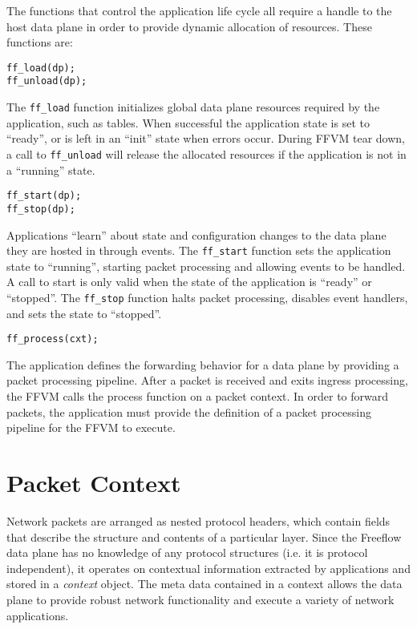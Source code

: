 The functions that control the application life cycle all require a handle
to the host data plane in order to provide dynamic allocation of resources.
These functions are:

\begin{lstlisting}
ff_load(dp);
ff_unload(dp);
\end{lstlisting}

The \texttt{ff\_load} function initializes global data plane resources required
by the application, such as tables. When successful the application state is
set to ``ready'', or is left in an ``init'' state when errors occur. During
FFVM tear down, a call to \texttt{ff\_unload} will release the allocated
resources if the application is not in a ``running'' state.

\begin{lstlisting}
ff_start(dp);
ff_stop(dp);
\end{lstlisting}

Applications ``learn'' about state and configuration changes to the data plane
they are hosted in through events. The \texttt{ff\_start} function sets the
application state to ``running'', starting packet processing and allowing events
to be handled. A call to start is only valid when the state of the application
is ``ready'' or ``stopped''. The \texttt{ff\_stop} function halts packet
processing, disables event handlers, and sets the state to ``stopped''.

\begin{lstlisting}
ff_process(cxt);
\end{lstlisting}

The application defines the forwarding behavior for a data plane by providing
a packet processing pipeline. After a packet is received and exits ingress
processing, the FFVM calls the process function on a packet context. In order
to forward packets, the application must provide the definition of a packet
processing pipeline for the FFVM to execute.

\section{Packet Context}
\label{vm:packet-context}
Network packets are arranged as nested protocol headers, which contain fields
that describe the structure and contents of a particular layer. Since the
Freeflow data plane has no knowledge of any protocol structures (i.e. it is
protocol independent), it operates on contextual information extracted by
applications and stored in a \emph{context} object. The meta data contained
in a context allows the data plane to provide robust network functionality
and execute a variety of network applications.

